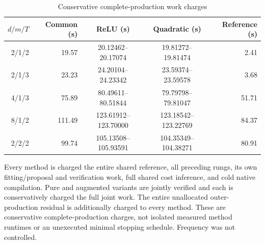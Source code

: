 \begin{table}[htbp]
\centering
\caption{Conservative complete-production work charges}\label{tab:release-work62}
{\small\setlength{\tabcolsep}{3pt}
\begin{tabular}{r r c c r}
\hline
$d/m/T$ & Common (s) & ReLU (s) & Quadratic (s) & Reference (s) \\
\hline
2/1/2 & 19.57 & 20.12462--20.17074 & 19.81272--19.81474 & 2.41 \\
2/1/3 & 23.23 & 24.20104--24.23342 & 23.59374--23.59578 & 3.68 \\
4/1/3 & 75.89 & 80.49611--80.51844 & 79.79798--79.81047 & 51.71 \\
8/1/2 & 111.49 & 123.61912--123.70000 & 123.18542--123.22769 & 84.37 \\
2/2/2 & 99.74 & 105.13508--105.93591 & 104.35349--104.38271 & 80.91 \\
\hline
\end{tabular}}
\par\smallskip
{\footnotesize Every method is charged the entire shared reference, all preceding rungs, its own fitting/proposal and verification work, full shared cost inference, and cold native compilation. Pure and augmented variants are jointly verified and each is conservatively charged the full joint work. The entire unallocated outer-production residual is additionally charged to every method. These are conservative complete-production charges, not isolated measured method runtimes or an unexecuted minimal stopping schedule. Frequency was not controlled.}
\end{table}
